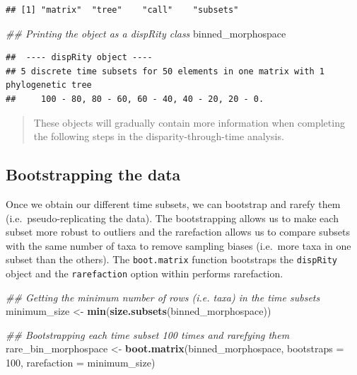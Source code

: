 \documentclass[
]{book}
\newenvironment{Shaded}{\begin{snugshade}}{\end{snugshade}}
\newcommand{\CommentTok}[1]{\textcolor[rgb]{0.56,0.35,0.01}{\textit{#1}}}
\newcommand{\DataTypeTok}[1]{\textcolor[rgb]{0.13,0.29,0.53}{#1}}
\newcommand{\DecValTok}[1]{\textcolor[rgb]{0.00,0.00,0.81}{#1}}
\newcommand{\KeywordTok}[1]{\textcolor[rgb]{0.13,0.29,0.53}{\textbf{#1}}}
\newcommand{\NormalTok}[1]{#1}
\newcommand{\StringTok}[1]{\textcolor[rgb]{0.31,0.60,0.02}{#1}}
\begin{document}
\begin{verbatim}
## [1] "matrix"  "tree"    "call"    "subsets"
\end{verbatim}

\begin{Shaded}
\begin{Highlighting}[]
\CommentTok{\#\# Printing the object as a dispRity class}
\NormalTok{binned\_morphospace}
\end{Highlighting}
\end{Shaded}

\begin{verbatim}
##  ---- dispRity object ---- 
## 5 discrete time subsets for 50 elements in one matrix with 1 phylogenetic tree
##     100 - 80, 80 - 60, 60 - 40, 40 - 20, 20 - 0.
\end{verbatim}

\begin{quote}
These objects will gradually contain more information when completing the following steps in the disparity-through-time analysis.
\end{quote}

\hypertarget{bootstrapping-the-data-1}{%
\subsection{Bootstrapping the data}\label{bootstrapping-the-data-1}}

Once we obtain our different time subsets, we can bootstrap and rarefy them (i.e.~pseudo-replicating the data).
The bootstrapping allows us to make each subset more robust to outliers and the rarefaction allows us to compare subsets with the same number of taxa to remove sampling biases (i.e.~more taxa in one subset than the others).
The \texttt{boot.matrix} function bootstraps the \texttt{dispRity} object and the \texttt{rarefaction} option within performs rarefaction.

\begin{Shaded}
\begin{Highlighting}[]
\CommentTok{\#\# Getting the minimum number of rows (i.e. taxa) in the time subsets}
\NormalTok{minimum\_size \textless{}{-}}\StringTok{ }\KeywordTok{min}\NormalTok{(}\KeywordTok{size.subsets}\NormalTok{(binned\_morphospace))}

\CommentTok{\#\# Bootstrapping each time subset 100 times and rarefying them }
\NormalTok{rare\_bin\_morphospace \textless{}{-}}\StringTok{ }\KeywordTok{boot.matrix}\NormalTok{(binned\_morphospace, }\DataTypeTok{bootstraps =} \DecValTok{100}\NormalTok{,}
    \DataTypeTok{rarefaction =}\NormalTok{ minimum\_size)}
\end{Highlighting}
\end{Shaded}
\end{document}
